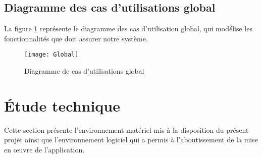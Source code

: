 \subsection{Diagramme des cas d'utilisations global}
La figure \ref{fig:ucgloab} représente le diagramme des cas d'utilisation global, qui modélise les fonctionnalités que doit assurer notre système.
\begin{figure}[htpb]
\centering
    \texttt{[image: Global]}
    \caption{Diagramme de cas d'utilisations global}
    \label{fig:ucgloab}
\end{figure}

\section{\'Etude technique}
Cette section présente l’environnement matériel mis à la disposition du présent projet ainsi que l’environnement logiciel qui a permis à l'aboutissement de la mise en \oe uvre de l'application.
